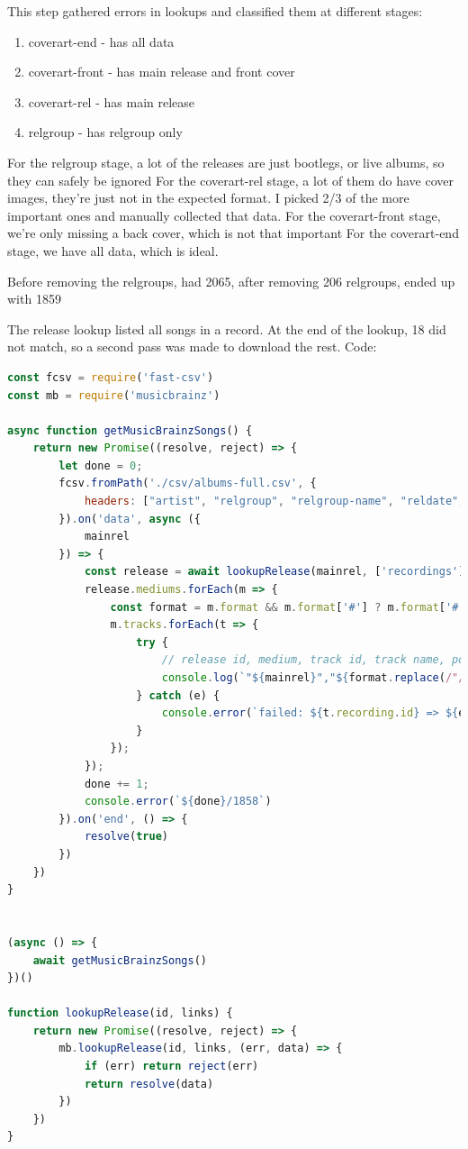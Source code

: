 \documentclass[10pt, a4paper]{article}
\begin{document}
This step gathered errors in lookups and classified them at different stages:

\begin{enumerate}
\item coverart-end - has all data
\item coverart-front - has main release and front cover
\item coverart-rel - has main release
\item relgroup - has relgroup only
\end{enumerate}

For the relgroup stage, a lot of the releases are just bootlegs, or live albums, so they can safely be ignored
For the coverart-rel stage, a lot of them do have cover images, they're just not in the expected format. I picked 2/3 of the more important ones and manually collected that data.
For the coverart-front stage, we're only missing a back cover, which is not that important
For the coverart-end stage, we have all data, which is ideal.

Before removing the relgroups, had 2065, after removing 206 relgroups, ended up with 1859

The release lookup listed all songs in a record. At the end of the lookup, 18 did not match, so a second pass was made to download the rest. Code:

\begin{lstlisting}[language=JavaScript, label=lst:trackDownload, caption = Track fetching from musicbrainz ]
const fcsv = require('fast-csv')
const mb = require('musicbrainz')

async function getMusicBrainzSongs() {
	return new Promise((resolve, reject) => {
		let done = 0;
		fcsv.fromPath('./csv/albums-full.csv', {
			headers: ["artist", "relgroup", "relgroup-name", "reldate", "mainrel", "frontcover", "backcover"]
		}).on('data', async ({
			mainrel
		}) => {
			const release = await lookupRelease(mainrel, ['recordings'])
			release.mediums.forEach(m => {
				const format = m.format && m.format['#'] ? m.format['#'] : m.position;
				m.tracks.forEach(t => {
					try {
						// release id, medium, track id, track name, position, length
						console.log(`"${mainrel}","${format.replace(/"/g,"'")}","${t.recording.id}","${t.recording.title}","${t.position}","${t.length}"`)
					} catch (e) {
						console.error(`failed: ${t.recording.id} => ${e.message}`)
					}
				});
			});
			done += 1;
			console.error(`${done}/1858`)
		}).on('end', () => {
			resolve(true)
		})
	})
}


(async () => {
	await getMusicBrainzSongs()
})()

function lookupRelease(id, links) {
	return new Promise((resolve, reject) => {
		mb.lookupRelease(id, links, (err, data) => {
			if (err) return reject(err)
			return resolve(data)
		})
	})
}

\end{lstlisting}
\end{document}
